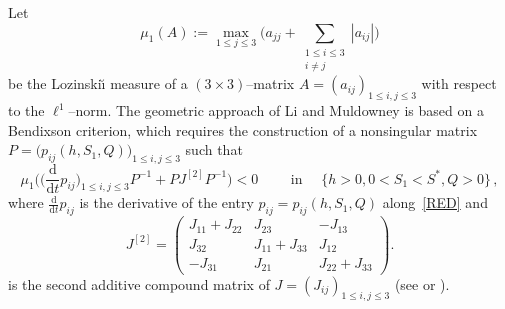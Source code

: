 \documentclass[reqno,11pt]{amsart}
\numberwithin{equation}{section}
\newcommand{\R}{\mathbb{R}}
\newcommand{\rd}{\mathrm{d}}
\begin{document}
Let 
\begin{equation}\label{mu1}
\mu_1(A):=\max_{1\le j\le3}\Big(a_{jj}+\sum_{\substack{1\le i\le3\\ i\ne j}}|a_{ij}|\Big)
\end{equation}
be the Lozinski\u{\i} measure of a $(3\times3)$--matrix $A=(a_{ij})_{1\le i,j\le3}$ with respect to the $\ell^1$--norm. The geometric approach of Li and Muldowney \cite{LiMuldowney1996,Li-Smith-Wang_01} is based on a Bendixson criterion, which requires the construction of a nonsingular matrix $P=\big(p_{ij}(h,S_1,Q)\big)_{1\le i,j\le3}$ such that
\begin{equation}\label{mu1X}
\mu_1\Big(\Big(\frac{\rd}{\rd t}p_{ij}\Big)_{1\le i,j\le3}P^{-1}+PJ^{[2]}P^{-1}\Big)<0
\qquad\text{ in }\quad\{h>0, 0<S_1<S^*, Q>0\}\,,
\end{equation}
where $\tfrac{\rd}{\rd t}p_{ij}$ is the derivative of the entry $p_{ij}=p_{ij}(h,S_1,Q)$ along~\eqref{RED} and
\begin{equation*}
J^{[2]}=\left(\begin{matrix}
J_{11}+J_{22} & J_{23} & -J_{13}\\
J_{32} & J_{11}+J_{33} & J_{12}\\
-J_{31} & J_{21} & J_{22}+J_{33}
\end{matrix}\right).
\end{equation*}
is the second additive compound matrix of $J=(J_{ij})_{1\le i,j\le3}$ (see \cite{Muldowney1990} or \cite[Appendix]{Li-Smith-Wang_01}).
\end{document}
